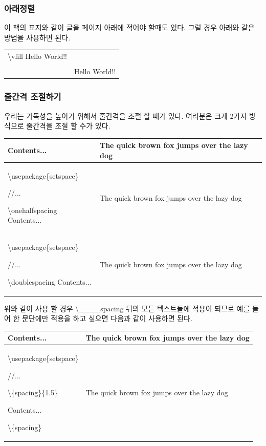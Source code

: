 \documentclass[12pt]{article}
\begin{document}
	\subsubsection{아래정렬}
	이 책의 표지와 같이 글을 페이지 아래에 적어야 할때도 있다. 그럴 경우 아래와 같은 방법을 사용하면 된다.\newline
	
	\begin{tabularx}{\textwidth \onehalfspacing}{|X|X|}
		\hline
		\textbackslash vfill Hello World!! & \\
		 & \\
		 & Hello World!!\\
		\hline
	\end{tabularx}
	\subsubsection{줄간격 조절하기}
	우리는 가독성을 높이기 위해서 줄간격을 조절 할 때가 있다. 여러분은 크게 2가지 방식으로 줄간격을 조절 할 수가 있다.\newline
	
	\begin{tabularx}{\textwidth}{|X|X|}
		\hline
		Contents... &The quick brown fox jumps over the lazy dog\\
		\hline
		\textbackslash usepackage\{setspace\} 
		
		//...
		
		\textbackslash onehalfspacing Contents... & \onehalfspacing The quick brown fox jumps over the lazy dog\\
		\hline
		\textbackslash usepackage\{setspace\} 
		
		//...
		
		\textbackslash  doublespacing Contents... & \doublespacing The quick brown fox jumps over the lazy dog\\
		\hline
	\end{tabularx}
	\newline
	\newline
	위와 같이 사용 할 경우 \textbackslash \_\_\_\_spacing 뒤의 모든 텍스트들에 적용이 되므로 예를 들어 한 문단에만 적용을 하고 싶으면 다음과 같이 사용하면 된다.\newline
	
	\begin{tabularx}{\textwidth}{|X|X|}
		\hline
		Contents... & The quick brown fox jumps over the lazy dog\\
		\hline
		\textbackslash usepackage\{setspace\} 
		
		//...
		
		\textbackslash \{spacing\}\{1.5\}
		
		Contents...
		
		\textbackslash \{spacing\} & \begin{spacing}{1.5} 
			The quick brown fox jumps over the lazy dog
		\end{spacing}\\
		\hline
	\end{tabularx}
\end{document}
